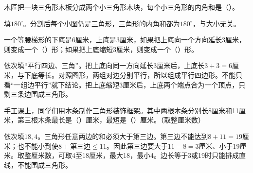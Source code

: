 木匠把一块三角形木板分成两个小三角形木块，每个小三角形的内角和是（\hspace{1.8em}）。\par
\begin{BookAnswer}
填\(180^\circ\)。分割后每个小图仍是三角形，三角形的内角和都为\(180^\circ\)，与大小无关。
\end{BookAnswer}

一个等腰梯形的下底是6厘米，上底是3厘米，如果把上底向一个方向延长3厘米，则变成一个（\hspace{1.8em}）形；如果把上底缩短3厘米，则变成一个（\hspace{1.8em}）形。\par
\begin{BookAnswer}
依次填“平行四边、三角”。把上底向同一方向延长3厘米后，上底长\(3+3=6\)厘米，与下底等长。对照图形，两组对边分别平行，所以组成平行四边形。不能只看“一组边平行”就下结论。把上底缩短3厘米后，上底两个端点合为一个顶点，只剩三条边围成三角形。
\end{BookAnswer}

手工课上，同学们用木条制作三角形装饰框架。其中两根木条分别长8厘米和11厘米，第三根木条最长是（\hspace{1.8em}）厘米，最短是（\hspace{1.8em}）厘米。（取整厘米数）\par
\begin{BookAnswer}
依次填\(18,4\)。三角形任意两边的和必须大于第三边。第三边不能达到\(8+11=19\)厘米；也不能小到使\(8+\text{第三边}\le11\)。因此第三边要大于\(11-8=3\)厘米、小于19厘米。取整厘米数，可取4至18厘米，最大18，最小4。边长等于3或19时只能排成直线，不能围成三角形。
\end{BookAnswer}

